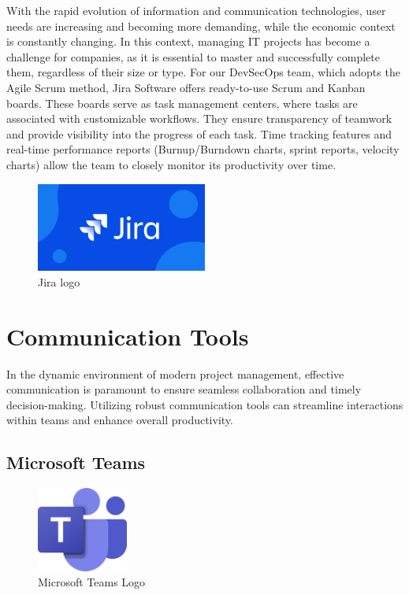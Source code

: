 With the rapid evolution of information and communication technologies, user needs are increasing and becoming more demanding, while the economic context is constantly changing. In this context, managing IT projects has become a challenge for companies, as it is essential to master and successfully complete them, regardless of their size or type. For our DevSecOps team, which adopts the Agile Scrum method, Jira Software offers ready-to-use Scrum and Kanban boards. These boards serve as task management centers, where tasks are associated with customizable workflows. They ensure transparency of teamwork and provide visibility into the progress of each task. Time tracking features and real-time performance reports (Burnup/Burndown charts, sprint reports, velocity charts) allow the team to closely monitor its productivity over time.

\begin{figure}[h]
    \centering
    \includegraphics[width=0.5\textwidth]{Logos/jira-png.png}
    \caption{Jira logo}
\end{figure}


\section{Communication Tools}

In the dynamic environment of modern project management, effective communication is paramount to ensure seamless collaboration and timely decision-making. Utilizing robust communication tools can streamline interactions within teams and enhance overall productivity.

\subsection{Microsoft Teams}

\begin{figure}[H]
  \centering
  \includegraphics[width=3cm]{Logos/microsoft_teams_logo.png}
  \caption{Microsoft Teams Logo}
\end{figure}

